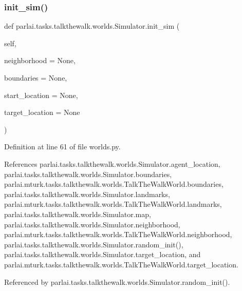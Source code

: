 \subsubsection{\texorpdfstring{init\+\_\+sim()}{init\_sim()}}
{\footnotesize\ttfamily def parlai.\+tasks.\+talkthewalk.\+worlds.\+Simulator.\+init\+\_\+sim (\begin{DoxyParamCaption}\item[{}]{self,  }\item[{}]{neighborhood = {\ttfamily None},  }\item[{}]{boundaries = {\ttfamily None},  }\item[{}]{start\+\_\+location = {\ttfamily None},  }\item[{}]{target\+\_\+location = {\ttfamily None} }\end{DoxyParamCaption})}



Definition at line 61 of file worlds.\+py.



References parlai.\+tasks.\+talkthewalk.\+worlds.\+Simulator.\+agent\+\_\+location, parlai.\+tasks.\+talkthewalk.\+worlds.\+Simulator.\+boundaries, parlai.\+mturk.\+tasks.\+talkthewalk.\+worlds.\+Talk\+The\+Walk\+World.\+boundaries, parlai.\+tasks.\+talkthewalk.\+worlds.\+Simulator.\+landmarks, parlai.\+mturk.\+tasks.\+talkthewalk.\+worlds.\+Talk\+The\+Walk\+World.\+landmarks, parlai.\+tasks.\+talkthewalk.\+worlds.\+Simulator.\+map, parlai.\+tasks.\+talkthewalk.\+worlds.\+Simulator.\+neighborhood, parlai.\+mturk.\+tasks.\+talkthewalk.\+worlds.\+Talk\+The\+Walk\+World.\+neighborhood, parlai.\+tasks.\+talkthewalk.\+worlds.\+Simulator.\+random\+\_\+init(), parlai.\+tasks.\+talkthewalk.\+worlds.\+Simulator.\+target\+\_\+location, and parlai.\+mturk.\+tasks.\+talkthewalk.\+worlds.\+Talk\+The\+Walk\+World.\+target\+\_\+location.



Referenced by parlai.\+tasks.\+talkthewalk.\+worlds.\+Simulator.\+random\+\_\+init().

